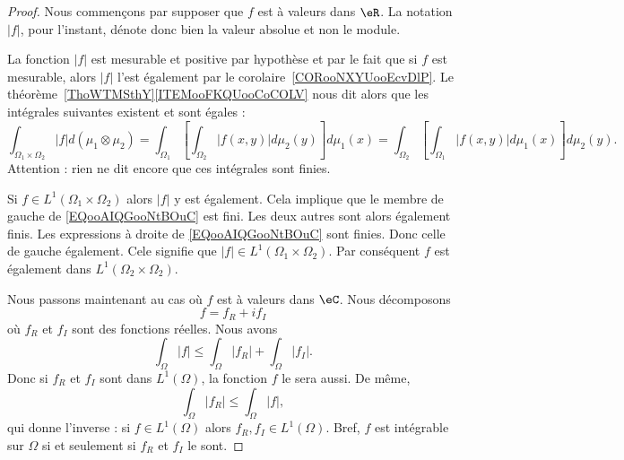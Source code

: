 \begin{proof}

	Nous commençons par supposer que \( f\) est à valeurs dans \( \eR\). La notation \( | f |\), pour l'instant,  dénote donc bien la valeur absolue et non le module.

	La fonction \( | f |\) est mesurable et positive par hypothèse et par le fait que si \( f\) est mesurable, alors \( | f |\) l'est également par le corolaire~\ref{CORooNXYUooEcvDlP}. Le théorème~\ref{ThoWTMSthY}\ref{ITEMooFKQUooCoCOLV} nous dit alors que les intégrales suivantes existent et sont égales :
	\begin{equation}        \label{EQooAIQGooNtBOuC}
		\int_{\Omega_1\times \Omega_2}| f |d(\mu_1\otimes \mu_2)=\int_{\Omega_1}\left[ \int_{\Omega_2}|f(x,y)|d\mu_2(y) \right]d\mu_1(x)
		=\int_{\Omega_2}\left[ \int_{\Omega_1}|f(x,y)|d\mu_1(x) \right]d\mu_2(y).
	\end{equation}
	Attention : rien ne dit encore que ces intégrales sont finies.

	\begin{subproof}
		Si \( f\in L^1(\Omega_1\times \Omega_2)\) alors \( | f |\) y est également. Cela implique que le membre de gauche de \eqref{EQooAIQGooNtBOuC} est fini. Les deux autres sont alors également finis.
		Les expressions à droite de \eqref{EQooAIQGooNtBOuC} sont finies. Donc celle de gauche également. Cele signifie que \( | f |\in L^1(\Omega_1\times \Omega_2)\). Par conséquent \( f\) est également dans \(L^1(\Omega_2\times \Omega_2) \).
	\end{subproof}

	Nous passons maintenant au cas où \( f\) est à valeurs dans \( \eC\). Nous décomposons
	\begin{equation}
		f=f_R+if_I
	\end{equation}
	où \( f_R\) et \( f_I\) sont des fonctions réelles. Nous avons
	\begin{equation}        \label{EQooZEOAooIMwKwk}
		\int_{\Omega}| f |\leq \int_{\Omega}| f_R |+\int_{\Omega}| f_I |.
	\end{equation}
	Donc si \( f_R\) et \( f_I\) sont dans \( L^1(\Omega)\), la fonction \( f\) le sera aussi. De même,
	\begin{equation}
		\int_{\Omega}| f_R |\leq \int_{\Omega}| f |,
	\end{equation}
	qui donne l'inverse : si \( f\in L^1(\Omega)\) alors \( f_R,f_I\in L^1(\Omega)\). Bref, \( f\) est intégrable sur \( \Omega\) si et seulement si \( f_R\) et \( f_I\) le sont.


\end{proof}

